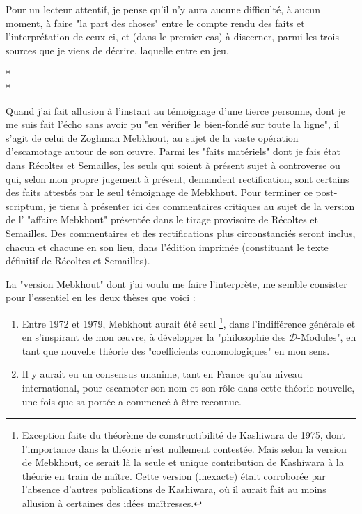 Pour un lecteur attentif, je pense qu'il n'y aura aucune difficulté, à aucun moment, à faire "la part des choses" entre le compte rendu des faits et l'interprétation de ceux-ci, et (dans le premier cas) à discerner, parmi les trois sources que je viens de décrire, laquelle entre en jeu.

\begin{center}
    * \quad * \\
    *
    \end{center}

Quand j’ai fait allusion à l'instant au témoignage d'une tierce personne, dont je me suis fait l'écho sans avoir pu "en vérifier le bien-fondé sur toute la ligne", il s'agit de celui de Zoghman Mebkhout, au sujet de la vaste opération d'escamotage autour de son œuvre. Parmi les "faits matériels" dont je fais état dans Récoltes et Semailles, les seuls qui soient à présent sujet à controverse ou qui, selon mon propre jugement à présent, demandent rectification, sont certains des faits attestés par le seul témoignage de Mebkhout. Pour terminer ce post-scriptum, je tiens à présenter ici des commentaires critiques au sujet de la version de l' "affaire Mebkhout" présentée dans le tirage provisoire de Récoltes et Semailles. Des commentaires et des rectifications plus circonstanciés seront inclus, chacun et chacune en son lieu, dans l'édition imprimée (constituant le texte définitif de Récoltes et Semailles).

La "version Mebkhout" dont j'ai voulu me faire l'interprète, me semble consister pour l'essentiel en les deux thèses que voici :

\begin{enumerate}
    \item Entre 1972 et 1979, Mebkhout aurait été seul \footnote{Exception faite du théorème de constructibilité de Kashiwara de 1975, dont l'importance dans la théorie n'est nullement contestée. Mais selon la version de Mebkhout, ce serait là la seule et unique contribution de Kashiwara à la théorie en train de naître. Cette version (inexacte) était corroborée par l'absence d'autres publications de Kashiwara, où il aurait fait au moins allusion à certaines des idées maîtresses.}, dans l'indifférence générale et en s'inspirant de mon œuvre, à développer la "philosophie des $\mathscr{D}$-Modules", en tant que nouvelle théorie des "coefficients cohomologiques" en mon sens.
    \item  Il y aurait eu un consensus unanime, tant en France qu'au niveau international, pour escamoter son nom et son rôle dans cette théorie nouvelle, une fois que sa portée a commencé à être reconnue.
\end{enumerate}

